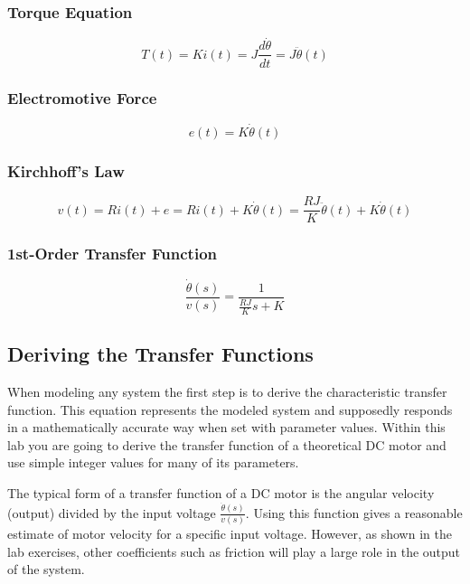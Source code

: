 \documentclass[11pt,fleqn]{book} %
\begin{document}
\subsubsection{Torque Equation}
\begin{equation}
T(t) = Ki(t) = J\frac{d\dot{\theta}}{dt}=J\ddot{\theta}(t) 
\end{equation}

\subsubsection{Electromotive Force}
\begin{equation}
e(t) = K\dot{\theta}(t)
\end{equation}

\subsubsection{Kirchhoff's Law}
\begin{equation}
v(t) = Ri(t) + e = Ri(t) + K\dot{\theta}(t) = \frac{RJ}{K}\ddot{\theta}(t)+K\dot{\theta}(t)
\end{equation}

\subsubsection{1st-Order Transfer Function}
\begin{equation}
\frac{\dot{\theta}(s)}{v(s)} = \frac{1}{\frac{RJ}{K}s+K}
\end{equation}


   
\subsection{Deriving the Transfer Functions}
When modeling any system the first step is to derive the characteristic transfer function. This equation represents the modeled system and supposedly responds in a mathematically accurate way when set with parameter values. Within this lab you are going to derive the transfer function of a theoretical DC motor and use simple integer values for many of its parameters. 

The typical form of a transfer function of a DC motor is the angular velocity (output) divided by the input voltage $\frac{\dot{\theta}(s)}{v(s)}$. Using this function gives a reasonable estimate of motor velocity for a specific input voltage. However, as shown in the lab exercises, other coefficients such as friction will play a large role in the output of the system. 
\end{document}
